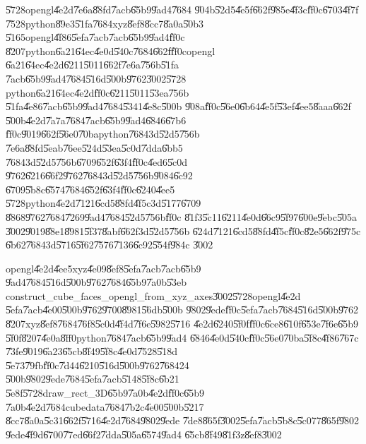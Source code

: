 \documentclass[12pt,a4paper]{article}
\begin{document}
\U{5728}opengl\U{4e2d}\U{7e6a}\U{88fd}\U{7acb}\U{65b9}\U{9ad4}\U{7684}%
\U{904b}\U{52d5}\U{4e5f}\U{662f}\U{985e}\U{4f3c}\U{ff0c}\U{6703}\U{4f7f}%
\U{7528}python\U{89e3}\U{51fa}\U{7684}xyz\U{8ef8}\U{8cc7}\U{8a0a}\U{50b3}%
\U{5165}opengl\U{4f86}\U{5efa}\U{7acb}\U{7acb}\U{65b9}\U{9ad4}\U{ff0c}%
\U{8207}python\U{6a21}\U{64ec}\U{4e0d}\U{540c}\U{7684}\U{662f}\U{ff0c}opengl%
\U{6a21}\U{64ec}\U{4e2d}\U{6211}\U{5011}\U{662f}\U{7e6a}\U{756b}\U{51fa}%
\U{7acb}\U{65b9}\U{9ad4}\U{7684}\U{516d}\U{500b}\U{9762}\U{3002}\U{5728}%
python\U{6a21}\U{64ec}\U{4e2d}\U{ff0c}\U{6211}\U{5011}\U{53ea}\U{756b}%
\U{51fa}\U{4e86}\U{7acb}\U{65b9}\U{9ad4}\U{7684}\U{5341}\U{4e8c}\U{500b}%
\U{908a}\U{ff0c}\U{56e0}\U{6b64}\U{4e5f}\U{53ef}\U{4ee5}\U{8aaa}\U{662f}%
\U{500b}\U{4e2d}\U{7a7a}\U{7684}\U{7acb}\U{65b9}\U{9ad4}\U{6846}\U{67b6}%
\U{ff0c}\U{9019}\U{662f}\U{56e0}\U{70ba}python\U{7684}3d\U{52d5}\U{756b}%
\U{7e6a}\U{88fd}\U{5eab}\U{76ee}\U{524d}\U{53ea}\U{5c0d}\U{7dda}\U{6bb5}%
\U{7684}3d\U{52d5}\U{756b}\U{6709}\U{652f}\U{63f4}\U{ff0c}\U{4ed6}\U{5c0d}%
\U{9762}\U{6216}\U{66f2}\U{9762}\U{7684}3d\U{52d5}\U{756b}\U{9084}\U{6c92}%
\U{6709}\U{5b8c}\U{6574}\U{7684}\U{652f}\U{63f4}\U{ff0c}\U{6240}\U{4ee5}%
\U{5728}python\U{4e2d}\U{7121}\U{6cd5}\U{88fd}\U{4f5c}3d\U{5177}\U{6709}%
\U{8868}\U{9762}\U{7684}\U{7269}\U{9ad4}\U{7684}\U{52d5}\U{756b}\U{ff0c}%
\U{81f3}\U{5c11}\U{6211}\U{4e0d}\U{66c9}\U{5f97}\U{600e}\U{9ebc}\U{505a}%
\U{3002}\U{9019}\U{88e1}\U{8981}\U{5f37}\U{8abf}\U{662f}3d\U{52d5}\U{756b}%
\U{624d}\U{7121}\U{6cd5}\U{88fd}\U{4f5c}\U{ff0c}\U{82e5}\U{662f}\U{975c}%
\U{6b62}\U{7684}3d\U{5716}\U{5f62}\U{7576}\U{7136}\U{6c92}\U{554f}\U{984c}%
\U{3002}

\bigskip

opengl\U{4e2d}\U{4ee5}xyz\U{4e09}\U{8ef8}\U{5efa}\U{7acb}\U{7acb}\U{65b9}%
\U{9ad4}\U{7684}\U{516d}\U{500b}\U{9762}\U{7684}\U{65b9}\U{7a0b}\U{53eb}%
construct\_cube\_faces\_opengl\_from\_xyz\_axes\U{3002}\U{5728}opengl\U{4e2d}%
\U{5efa}\U{7acb}\U{4e00}\U{500b}\U{9762}\U{9700}\U{8981}\U{56db}\U{500b}%
\U{9802}\U{9ede}\U{ff0c}\U{5efa}\U{7acb}\U{7684}\U{516d}\U{500b}\U{9762}%
\U{8207}xyz\U{8ef8}\U{7684}\U{76f8}\U{5c0d}\U{4f4d}\U{7f6e}\U{5982}\U{5716}%
\U{4e2d}\U{6240}\U{5f0f}\U{ff0c}\U{6ce8}\U{610f}\U{653e}\U{7f6e}\U{65b9}%
\U{5f0f}\U{8207}\U{4e0a}\U{8ff0}python\U{7684}\U{7acb}\U{65b9}\U{9ad4}%
\U{6846}\U{4e0d}\U{540c}\U{ff0c}\U{56e0}\U{70ba}\U{5f8c}\U{4f86}\U{767c}%
\U{73fe}\U{9019}\U{6a23}\U{65cb}\U{8f49}\U{5f8c}\U{4e0d}\U{7528}\U{518d}%
\U{5e73}\U{79fb}\U{ff0c}\U{7d44}\U{6210}\U{516d}\U{500b}\U{9762}\U{7684}24%
\U{500b}\U{9802}\U{9ede}\U{7684}\U{5efa}\U{7acb}\U{5148}\U{5f8c}\U{6b21}%
\U{5e8f}\U{5728}draw\_rect\_3D\U{65b9}\U{7a0b}\U{4e2d}\U{ff0c}\U{65b9}%
\U{7a0b}\U{4e2d}\U{7684}cubedata\U{7684}\U{7b2c}\U{4e00}\U{500b}\U{5217}%
\U{8cc7}\U{8a0a}\U{5c31}\U{662f}\U{5716}\U{4e2d}\U{7684}\U{9802}\U{9ede}%
\U{7de8}\U{865f}\U{3002}\U{5efa}\U{7acb}\U{5b8c}\U{5c07}7\U{865f}\U{9802}%
\U{9ede}\U{4f9d}\U{6700}\U{77ed}\U{66f2}\U{7dda}\U{505a}\U{6574}\U{9ad4}%
\U{65cb}\U{8f49}\U{81f3}z\U{8ef8}\U{3002}
\end{document}
